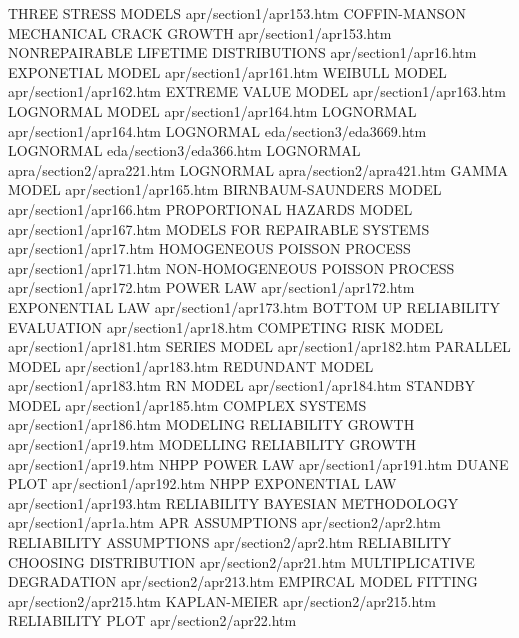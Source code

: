 THREE STRESS MODELS                     apr/section1/apr153.htm
COFFIN-MANSON MECHANICAL CRACK GROWTH   apr/section1/apr153.htm
NONREPAIRABLE LIFETIME DISTRIBUTIONS    apr/section1/apr16.htm
EXPONETIAL MODEL                        apr/section1/apr161.htm
WEIBULL MODEL                           apr/section1/apr162.htm
EXTREME VALUE MODEL                     apr/section1/apr163.htm
LOGNORMAL MODEL                         apr/section1/apr164.htm
LOGNORMAL                               apr/section1/apr164.htm
LOGNORMAL                               eda/section3/eda3669.htm
LOGNORMAL                               eda/section3/eda366.htm
LOGNORMAL                               apra/section2/apra221.htm
LOGNORMAL                               apra/section2/apra421.htm
GAMMA MODEL                             apr/section1/apr165.htm
BIRNBAUM-SAUNDERS MODEL                 apr/section1/apr166.htm
PROPORTIONAL HAZARDS MODEL              apr/section1/apr167.htm
MODELS FOR REPAIRABLE SYSTEMS           apr/section1/apr17.htm
HOMOGENEOUS POISSON PROCESS             apr/section1/apr171.htm
NON-HOMOGENEOUS POISSON PROCESS         apr/section1/apr172.htm
POWER LAW                               apr/section1/apr172.htm
EXPONENTIAL LAW                         apr/section1/apr173.htm
BOTTOM UP RELIABILITY EVALUATION        apr/section1/apr18.htm
COMPETING RISK MODEL                    apr/section1/apr181.htm
SERIES MODEL                            apr/section1/apr182.htm
PARALLEL MODEL                          apr/section1/apr183.htm
REDUNDANT MODEL                         apr/section1/apr183.htm
RN MODEL                                apr/section1/apr184.htm
STANDBY MODEL                           apr/section1/apr185.htm
COMPLEX SYSTEMS                         apr/section1/apr186.htm
MODELING RELIABILITY GROWTH             apr/section1/apr19.htm
MODELLING RELIABILITY GROWTH            apr/section1/apr19.htm
NHPP POWER LAW                          apr/section1/apr191.htm
DUANE PLOT                              apr/section1/apr192.htm
NHPP EXPONENTIAL LAW                    apr/section1/apr193.htm
RELIABILITY BAYESIAN METHODOLOGY        apr/section1/apr1a.htm
APR ASSUMPTIONS                         apr/section2/apr2.htm
RELIABILITY ASSUMPTIONS                 apr/section2/apr2.htm
RELIABILITY CHOOSING DISTRIBUTION       apr/section2/apr21.htm
MULTIPLICATIVE DEGRADATION              apr/section2/apr213.htm
EMPIRCAL MODEL FITTING                  apr/section2/apr215.htm
KAPLAN-MEIER                            apr/section2/apr215.htm
RELIABILITY PLOT                        apr/section2/apr22.htm
